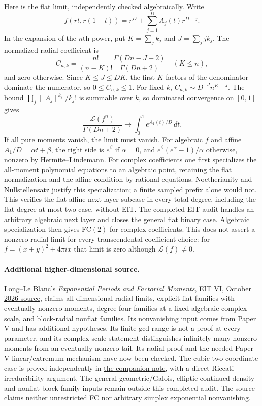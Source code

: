 \documentclass[11pt]{article}
\newcommand{\Lfac}{\mathcal L}
\begin{document}
Here is the flat limit, independently checked algebraically. Write
\[
 f(rt,r(1-t))=r^D+\sum_{j=1}^D A_j(t)r^{D-j}.
\]
In the expansion of the $n$th power, put $K=\sum_j k_j$ and $J=\sum_jjk_j$.
The normalized radial coefficient is
\[
 C_{n,k}=\frac{n!}{(n-K)!}\frac{\Gamma(Dn-J+2)}{\Gamma(Dn+2)}
 \quad(K\leq n),
\]
and zero otherwise. Since $K\leq J\leq DK$, the first $K$ factors of the
denominator dominate the numerator, so $0\leq C_{n,k}\leq1$.
For fixed $k$, $C_{n,k}\sim D^{-J}n^{K-J}$.
The bound $\prod_j\|A_j\|^{k_j}/k_j!$ is summable over $k$, so dominated
convergence on $[0,1]$ gives
\[
 \frac{\Lfac(f^n)}{\Gamma(Dn+2)}\longrightarrow
       \int_0^1e^{A_1(t)/D}\,dt.                            \tag{3}
\]
If all pure moments vanish, the limit must vanish. For algebraic $f$ and
affine $A_1/D=\alpha t+\beta$, the right side is $e^\beta$ if $\alpha=0$,
and $e^\beta(e^\alpha-1)/\alpha$ otherwise, nonzero by Hermite--Lindemann.
For complex coefficients one first specializes the all-moment polynomial
equations to an algebraic point, retaining the flat normalization and the
affine condition by rational equations. Noetherianity and Nullstellensatz
justify this specialization; a finite sampled prefix alone would not.
This verifies the flat affine-next-layer subcase in every total degree,
including the flat degree-at-most-two case, without EIT.
The completed EIT audit handles an arbitrary algebraic next layer and
closes the general flat binary case. Algebraic specialization then gives
FC$(2)$ for complex coefficients. This does not assert a nonzero radial
limit for every transcendental coefficient choice: for
$f=(x+y)^2+4\pi i x$ that limit is zero although $\Lfac(f)\ne0$.

\paragraph{Additional higher-dimensional source.}
Long--Le Blanc's \emph{Exponential Periods and Factorial Moments}, EIT VI,
\href{https://github.com/long-mathematics/exponential-integral-theorem/blob/92db79eedeb064694ff20e9201d73fc2bc0857f4/papers/06-exponential-factorial-moments/exponential-factorial-moments.tex}{October 2026 source},
claims all-dimensional radial limits, explicit flat families with eventually
nonzero moments, degree-four families at a fixed algebraic complex scale,
and block-radial nonflat families. Its nonvanishing input comes from
Paper V and has additional hypotheses. Its finite gcd range is not a
proof at every parameter, and its complex-scale statement distinguishes
infinitely many nonzero moments from an eventually nonzero tail.
Its radial proof and the needed Paper V linear/extremum mechanism have now
been checked. The cubic two-coordinate case is proved independently in
\href{TWO_ANGULAR_COORDINATES.tex}{the companion note}, with a direct Riccati
irreducibility argument. The general geometric/Galois, elliptic
continued-density and nonflat block-family inputs remain outside this
completed audit. The source claims neither unrestricted FC nor arbitrary
simplex exponential nonvanishing.
\end{document}
